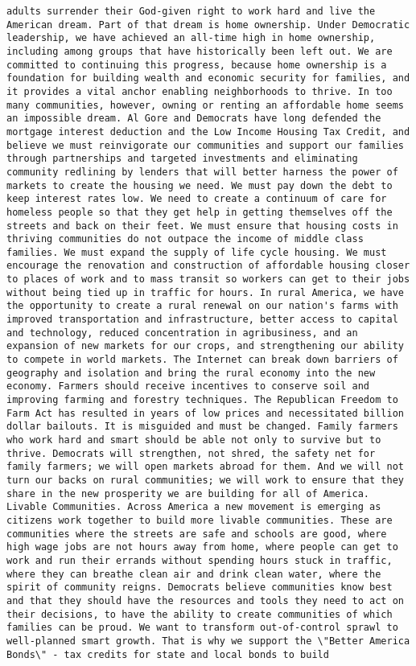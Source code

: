 \documentclass[
]{article}
\begin{document}
\begin{verbatim}
adults surrender their God-given right to work hard and live the American dream. Part of that dream is home ownership. Under Democratic leadership, we have achieved an all-time high in home ownership, including among groups that have historically been left out. We are committed to continuing this progress, because home ownership is a foundation for building wealth and economic security for families, and it provides a vital anchor enabling neighborhoods to thrive. In too many communities, however, owning or renting an affordable home seems an impossible dream. Al Gore and Democrats have long defended the mortgage interest deduction and the Low Income Housing Tax Credit, and believe we must reinvigorate our communities and support our families through partnerships and targeted investments and eliminating community redlining by lenders that will better harness the power of markets to create the housing we need. We must pay down the debt to keep interest rates low. We need to create a continuum of care for homeless people so that they get help in getting themselves off the streets and back on their feet. We must ensure that housing costs in thriving communities do not outpace the income of middle class families. We must expand the supply of life cycle housing. We must encourage the renovation and construction of affordable housing closer to places of work and to mass transit so workers can get to their jobs without being tied up in traffic for hours. In rural America, we have the opportunity to create a rural renewal on our nation's farms with improved transportation and infrastructure, better access to capital and technology, reduced concentration in agribusiness, and an expansion of new markets for our crops, and strengthening our ability to compete in world markets. The Internet can break down barriers of geography and isolation and bring the rural economy into the new economy. Farmers should receive incentives to conserve soil and improving farming and forestry techniques. The Republican Freedom to Farm Act has resulted in years of low prices and necessitated billion dollar bailouts. It is misguided and must be changed. Family farmers who work hard and smart should be able not only to survive but to thrive. Democrats will strengthen, not shred, the safety net for family farmers; we will open markets abroad for them. And we will not turn our backs on rural communities; we will work to ensure that they share in the new prosperity we are building for all of America. Livable Communities. Across America a new movement is emerging as citizens work together to build more livable communities. These are communities where the streets are safe and schools are good, where high wage jobs are not hours away from home, where people can get to work and run their errands without spending hours stuck in traffic, where they can breathe clean air and drink clean water, where the spirit of community reigns. Democrats believe communities know best and that they should have the resources and tools they need to act on their decisions, to have the ability to create communities of which families can be proud. We want to transform out-of-control sprawl to well-planned smart growth. That is why we support the \"Better America Bonds\" - tax credits for state and local bonds to build 
\end{verbatim}
\end{document}
